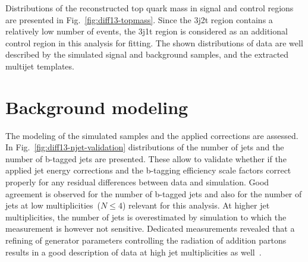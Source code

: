 Distributions of the reconstructed top quark mass in signal and control regions are presented in Fig.~\ref{fig:diff13-topmass}. Since the 3j2t region contains a relatively low number of events, the 3j1t region is considered as an additional \ttbar control region in this analysis for fitting. The shown distributions of data are well described by the simulated signal and background samples, and the extracted multijet templates.

 


\section{Background modeling}
\label{sec:diff13-modeling}

The modeling of the simulated samples and the applied corrections are assessed. In Fig.~\ref{fig:diff13-njet-validation} distributions of the number of jets and the number of b-tagged jets are presented. These allow to validate whether if the applied jet energy corrections and the b-tagging efficiency scale factors correct properly for any residual differences between data and simulation. Good agreement is observed for the number of b-tagged jets and also for the number of jets at low multiplicities~($N\leq4$) relevant for this analysis. At higher jet multiplicities, the number of jets is overestimated by simulation to which the measurement is however not sensitive. Dedicated \ttbar measurements revealed that a refining of generator parameters controlling the radiation of addition partons results in a good description of data at high jet multiplicities as well~\cite{CMS-PAS-TOP-16-021}.


